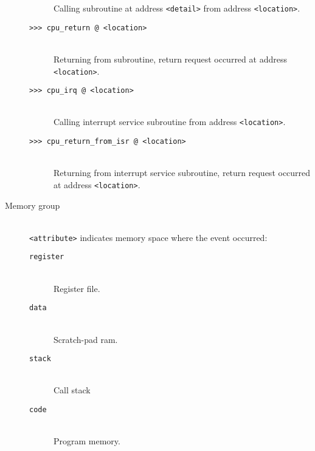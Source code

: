 \begin{description}
\begin{description}
                        Calling subroutine at address \texttt{<detail>} from address \texttt{<location>}.
                    \item[\texttt{>{}>{}> cpu\_return @ <location>}]~\\
                        Returning from subroutine, return request occurred at address \texttt{<location>}.
                    \item[\texttt{>{}>{}> cpu\_irq @ <location>}]~\\
                        Calling interrupt service subroutine from address \texttt{<location>}.
                    \item[\texttt{>{}>{}> cpu\_return\_from\_isr @ <location>}]~\\
                        Returning from interrupt service subroutine, return request occurred at address \texttt{<location>}.
                \end{description}

            \item[Memory group]~\\
                \texttt{<attribute>} indicates memory space where the event occurred:
                \begin{description}
                    \item[\texttt{register}]~\\
                        Register file.
                    \item[\texttt{data}]~\\
                        Scratch-pad ram.
                    \item[\texttt{stack}]~\\
                        Call stack
                    \item[\texttt{code}]~\\
                        Program memory.
                \end{description}


\end{description}
